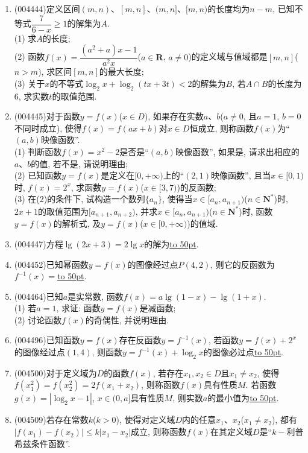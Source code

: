 \documentclass[10pt,a4paper]{article}
\newcommand{\blank}[1]{\underline{\hbox to #1pt{}}}
\begin{document}
\begin{enumerate}[1.]
\item {\tiny (004444)}定义区间$(m,n)$、$[m,n]$、$(m,n]$、$[m,n)$的长度均为$n-m$, 已知不等式$\dfrac 7{6-x}\ge 1$的解集为$A$.\\
(1) 求$A$的长度;\\
(2) 函数$f(x)=\dfrac{(a^2+a)x-1}{a^2x}$($a\in \mathbf{R}$, $a\ne 0$)的定义域与值域都是$[m,n]$($n>m$), 求区间$[m,n]$的最大长度;\\
(3) 关于$x$的不等式$\log_2x+\log_2(tx+3t)<2$的解集为$B$, 若$A\cap B$的长度为$6$, 求实数$t$的取值范围.
\item {\tiny (004445)}对于函数$y=f(x)$($x\in D$), 如果存在实数$a$、$b$($a\ne 0$, 且$a=1$, $b=0$不同时成立), 使得$f(x)=f(ax+b)$对$x\in D$恒成立, 则称函数$f(x)$为``$(a,b)$映像函数''.\\
(1) 判断函数$f(x)=x^2-2$是否是``$(a,b)$映像函数'', 如果是, 请求出相应的$a$、$b$的值, 若不是, 请说明理由;\\
(2) 已知函数$y=f(x)$是定义在$[0,+\infty)$上的``$(2,1)$映像函数'', 且当$x\in [0,1)$时, $f(x)=2^x$, 求函数$y=f(x)$($x\in [3,7)$)的反函数;\\
(3) 在(2)的条件下, 试构造一个数列$\{a_n\}$, 使得当$x\in [a_n,{a_{n+1}})$($n\in \mathbf{N}^*$)时, $2x+1$的取值范围为$[{a_{n+1}},{a_{n+2}})$, 并求$x\in [a_n,{a_{n+1}})$($n\in \mathbf{N}^*$)时, 函数$y=f(x)$的解析式, 及$y=f(x)$($x\in [0,+\infty)$)的值域.
\item {\tiny (004447)}方程$\lg(2x+3)=2\lg x$的解为\blank{50}.
\item {\tiny (004452)}已知幂函数$y=f(x)$的图像经过点$P(4,2)$, 则它的反函数为$f^{-1}(x)=$\blank{50}.
\item {\tiny (004464)}已知$a$是实常数, 函数$f(x)=a\lg(1-x)-\lg (1+x)$.\\
(1) 若$a=1$, 求证: 函数$y=f(x)$是减函数;\\
(2) 讨论函数$f(x)$的奇偶性, 并说明理由.
\item {\tiny (004496)}已知函数$y=f(x)$存在反函数$y=f^{-1}(x)$, 若函数$y=f(x)+2^x$的图像经过点$(1,4)$, 则函数$y=f^{-1}(x)+\log_2x$的图像必过点\blank{50}.
\item {\tiny (004500)}对于定义域为$D$的函数$f(x)$, 若存在$x_1,x_2\in D$且$x_1\ne x_2$, 使得$f(x_1^2)=f(x_2^2)=2f(x_1+x_2)$, 则称函数$f(x)$具有性质$M$. 若函数$g(x)=|\log_2x-1|$, $x\in (0,a]$具有性质$M$, 则实数$a$的最小值为\blank{50}.
\item {\tiny (004509)}若存在常数$k$($k>0$), 使得对定义域$D$内的任意$x_1$、$x_2$($x_1\ne x_2$), 都有$|f(x_1)-f(x_2)|\le k|x_1-x_2|$成立, 则称函数$f(x)$在其定义域$D$是``$k-$利普希兹条件函数''.\\

\end{enumerate}
\end{document}

